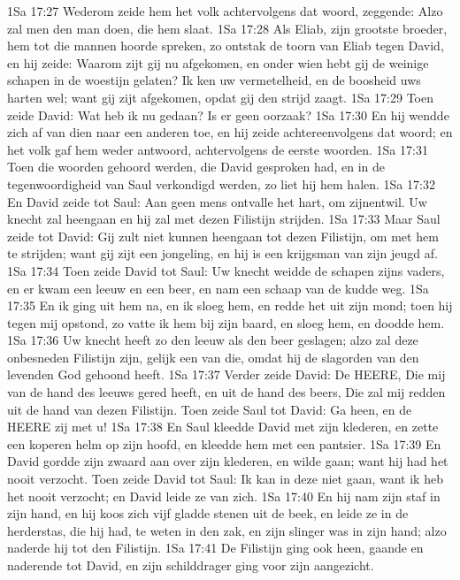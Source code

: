 1Sa 17:27  Wederom zeide hem het volk achtervolgens dat woord, zeggende: Alzo zal men den man doen, die hem slaat.
1Sa 17:28  Als Eliab, zijn grootste broeder, hem tot die mannen hoorde spreken, zo ontstak de toorn van Eliab tegen David, en hij zeide: Waarom zijt gij nu afgekomen, en onder wien hebt gij de weinige schapen in de woestijn gelaten? Ik ken uw vermetelheid, en de boosheid uws harten wel; want gij zijt afgekomen, opdat gij den strijd zaagt.
1Sa 17:29  Toen zeide David: Wat heb ik nu gedaan? Is er geen oorzaak?
1Sa 17:30  En hij wendde zich af van dien naar een anderen toe, en hij zeide achtereenvolgens dat woord; en het volk gaf hem weder antwoord, achtervolgens de eerste woorden.
1Sa 17:31  Toen die woorden gehoord werden, die David gesproken had, en in de tegenwoordigheid van Saul verkondigd werden, zo liet hij hem halen.
1Sa 17:32  En David zeide tot Saul: Aan geen mens ontvalle het hart, om zijnentwil. Uw knecht zal heengaan en hij zal met dezen Filistijn strijden.
1Sa 17:33  Maar Saul zeide tot David: Gij zult niet kunnen heengaan tot dezen Filistijn, om met hem te strijden; want gij zijt een jongeling, en hij is een krijgsman van zijn jeugd af.
1Sa 17:34  Toen zeide David tot Saul: Uw knecht weidde de schapen zijns vaders, en er kwam een leeuw en een beer, en nam een schaap van de kudde weg.
1Sa 17:35  En ik ging uit hem na, en ik sloeg hem, en redde het uit zijn mond; toen hij tegen mij opstond, zo vatte ik hem bij zijn baard, en sloeg hem, en doodde hem.
1Sa 17:36  Uw knecht heeft zo den leeuw als den beer geslagen; alzo zal deze onbesneden Filistijn zijn, gelijk een van die, omdat hij de slagorden van den levenden God gehoond heeft.
1Sa 17:37  Verder zeide David: De HEERE, Die mij van de hand des leeuws gered heeft, en uit de hand des beers, Die zal mij redden uit de hand van dezen Filistijn. Toen zeide Saul tot David: Ga heen, en de HEERE zij met u!
1Sa 17:38  En Saul kleedde David met zijn klederen, en zette een koperen helm op zijn hoofd, en kleedde hem met een pantsier.
1Sa 17:39  En David gordde zijn zwaard aan over zijn klederen, en wilde gaan; want hij had het nooit verzocht. Toen zeide David tot Saul: Ik kan in deze niet gaan, want ik heb het nooit verzocht; en David leide ze van zich.
1Sa 17:40  En hij nam zijn staf in zijn hand, en hij koos zich vijf gladde stenen uit de beek, en leide ze in de herderstas, die hij had, te weten in den zak, en zijn slinger was in zijn hand; alzo naderde hij tot den Filistijn.
1Sa 17:41  De Filistijn ging ook heen, gaande en naderende tot David, en zijn schilddrager ging voor zijn aangezicht.
